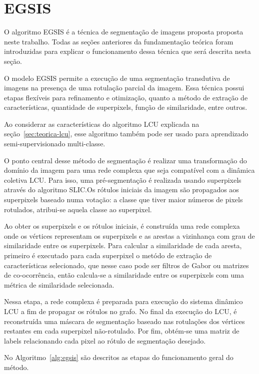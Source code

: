 \section{EGSIS}\label{sec:teorica-egsis}

O algoritmo \gls{EGSIS} é a técnica de segmentação de imagens proposta
proposta neste trabalho. Todas as seções anteriores da fundamentação
teórica foram introduzidas para explicar o funcionamento dessa técnica
que será descrita nesta seção.

O modelo \gls{EGSIS} permite a execução de uma segmentação transdutiva
de imagens na presença de uma rotulação parcial da imagem. Essa
técnica possui etapas flexíveis para refinamento e otimização, quanto
a método de extração de características, quantidade de superpixels,
função de similaridade, entre outros.

Ao considerar as características do algoritmo LCU explicada na
seção~\ref{sec:teorica-lcu}, esse algoritmo também pode ser usado para
aprendizado semi-supervisionado multi-classe.

O ponto central desse método de segmentação é realizar uma
transformação do domínio da imagem para uma rede complexa que seja
compatível com a dinâmica coletiva \gls{LCU}. Para isso, uma
pré-segmentação é realizada usando superpixels através do algoritmo
SLIC.\@ Os rótulos iniciais da imagem são propagados aos superpixels
baseado numa votação: a classe que tiver maior números de pixels
rotulados, atribui-se aquela classe ao superpixel.

Ao obter os superpixels e os rótulos iniciais, é construída uma rede
complexa onde os vértices representam os superpixels e as arestas a
vizinhança com grau de similaridade entre os superpixels. Para
calcular a similaridade de cada aresta, primeiro é executado para cada
superpixel o metódo de extração de características selecionado, que
nesse caso pode ser filtros de Gabor ou matrizes de co-ocorrência,
então calcula-se a similaridade entre os superpixels com uma métrica
de similaridade selecionada.

Nessa etapa, a rede complexa é preparada para execução do sistema
dinâmico \gls{LCU} a fim de propagar os rótulos no grafo. No final da
execução do \gls{LCU}, é reconstruída uma máscara de segmentação
baseado nas rotulações dos vértices restantes em cada superpixel
não-rotulado. Por fim, obtém-se uma matriz de labels relacionando
cada pixel ao rótulo de segmentação desejado.

No Algoritmo~\ref{alg:egsis} são descritos as etapas do funcionamento
geral do método.

